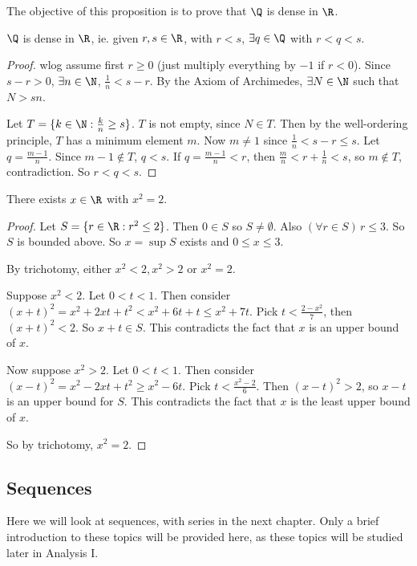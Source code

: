 \documentclass[a4paper]{article}
\begin{document}
The objective of this proposition is to prove that $\Q$ is dense in $\R$.
\begin{thm}
  $\Q$ is dense in $\R$, ie. given $r, s\in \R$, with $r < s$, $\exists q\in \Q$ with $r < q < s$.
\end{thm}

\begin{proof}
  wlog assume first $r \geq 0$ (just multiply everything by $-1$ if $r < 0$). Since $s - r > 0$, $\exists n\in \N$, $\frac{1}{n} < s - r$. By the Axiom of Archimedes, $\exists N\in \N$ such that $N > sn$.

  Let $T = \{k\in \N: \frac{k}{n}\geq s\}$. $T$ is not empty, since $N\in T$. Then by the well-ordering principle, $T$ has a minimum element $m$. Now $m\not= 1$ since $\frac{1}{n} < s - r \leq s$. Let $q = \frac{m - 1}{n}$. Since $m - 1\not\in T$, $q < s$. If $q =\frac{m - 1}{n}< r$, then $\frac{m}{n} < r + \frac{1}{n} < s$, so $m\not\in T$, contradiction. So $r < q < s$.
\end{proof}

\begin{thm}
  There exists $x\in \R$ with $x^2 = 2$.
\end{thm}

\begin{proof}
  Let $S = \{r\in \R: r^2 \leq 2\}$. Then $0\in S$ so $S\not= \emptyset$. Also $(\forall r\in S)\,r \leq 3$. So $S$ is bounded above. So $x = \sup S$ exists and $0\leq x \leq 3$.

  By trichotomy, either $x^2 < 2, x^2 > 2$ or $x^2 = 2$.

  Suppose $x^2 < 2$. Let $0 < t < 1$. Then consider $(x + t)^2 = x^2 + 2xt + t^2 < x^2 + 6t + t \leq x^2 + 7t$. Pick $t < \frac{2 - x^2}{7}$, then $(x + t)^2 < 2$. So $x + t \in S$. This contradicts the fact that $x$ is an upper bound of $x$.

  Now suppose $x^2 > 2$. Let $0 < t < 1$. Then consider $(x - t)^2 = x^2 - 2xt + t^2 \geq x^2 - 6t$. Pick $t < \frac{x^2 - 2}{6}$. Then $(x - t)^2 > 2$, so $x - t$ is an upper bound for $S$. This contradicts the fact that $x$ is the least upper bound of $x$.

  So by trichotomy, $x^2 = 2$.
\end{proof}

\subsection{Sequences}
Here we will look at sequences, with series in the next chapter. Only a brief introduction to these topics will be provided here, as these topics will be studied later in Analysis I.
\end{document}
